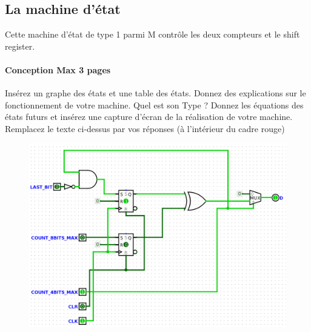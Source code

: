 \documentclass[a4paper]{article} %
\begin{document}
\subsection{La machine d’état}
Cette machine d’état de type 1 parmi M contrôle les deux compteurs et le shift register. 
\begin{tcolorbox}[colframe=Monokaimagenta,colback=white]
\paragraph{Conception Max 3 pages}
Insérez un graphe des états et une table des états. Donnez des explications sur le fonctionnement de votre machine. Quel est son Type ?
Donnez les équations des états futurs et insérez une capture d’écran de la réalisation de votre machine.
Remplacez le texte ci-dessus par vos réponses (à l’intérieur du cadre rouge)\\

\begin{figure}[H]
\centering
    \includegraphics[width=.8\textwidth]{src/STAMAC.png}
    \label{fig:stamac}
\end{figure}



\end{tcolorbox}
\end{document}
